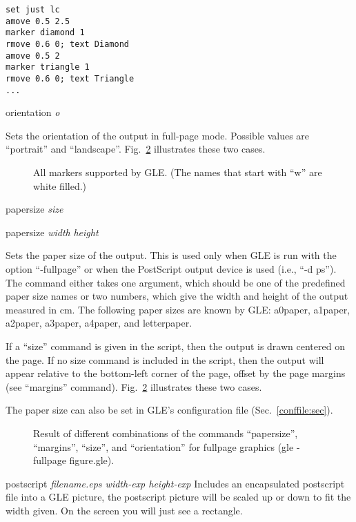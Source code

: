 \begin{commanddescription}
\begin{Verbatim}
set just lc
amove 0.5 2.5
marker diamond 1
rmove 0.6 0; text Diamond
amove 0.5 2
marker triangle 1
rmove 0.6 0; text Triangle
...
\end{Verbatim}

\item[{\sf orientation {\it o}}]\label{orient:cmd}

Sets the orientation of the output in full-page mode. Possible values are ``portrait'' and ``landscape''. Fig.~\ref{fullpage:fig} illustrates these two cases.

\begin{figure}[tb]
\centering
\mbox{}
\caption{\label{mark:fig}All markers supported by GLE. (The names that start with ``w'' are white filled.)}
\end{figure}

\item[{\sf papersize {\it size}}]\label{papsiz:cmd}
\item[{\sf papersize {\it width} {\it height}}]

Sets the paper size of the output. This is used only when GLE is run with the option ``-fullpage'' or when the PostScript output device is used (i.e., ``-d ps''). The command either takes one argument, which should be one of the predefined paper size names or two numbers, which give the width and height of the output measured in cm. The following paper sizes are known by GLE: a0paper, a1paper, a2paper, a3paper, a4paper, and letterpaper.

If a ``size'' command is given in the script, then the output is drawn centered on the page. If no size command is included in the script, then the output will appear relative to the bottom-left corner of the page, offset by the page margins (see ``margins'' command). Fig.~\ref{fullpage:fig} illustrates these two cases.

The paper size can also be set in GLE's configuration file (Sec.~\ref{conffile:sec}).

\begin{figure}[tb]
\centering
\mbox{}
\caption{\label{fullpage:fig}Result of different combinations of the commands ``papersize'', ``margins'', ``size'', and ``orientation'' for fullpage graphics (gle -fullpage figure.gle).}
\end{figure}

\item[{\sf postscript {\it filename.eps  width-exp height-exp}} ]
 Includes an encapsulated postscript file into a
GLE picture, the postscript picture will be scaled up or down to fit
the width given.  On the screen you will just see a rectangle.


\end{commanddescription}
